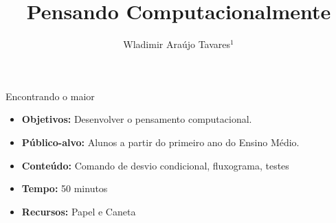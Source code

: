 \documentclass{beamer}
\title {Pensando Computacionalmente}
\author[Wladimir Araújo Tavares]{ Wladimir Araújo Tavares$^{1}$  }
\institute[UFC]{$^{1}$Universidade Federal do Ceará - Campus de Quixadá\\}
\date{}
\begin{document}
\begin{frame}
	\titlepage
\end{frame}




\begin{frame}{Encontrando o maior}

\begin{itemize}
\item \textbf{Objetivos:} Desenvolver o pensamento computacional.

\item \textbf{Público-alvo:}  Alunos a partir do primeiro ano do Ensino Médio.

\item \textbf{Conteúdo:} Comando de desvio condicional, fluxograma, testes

\item \textbf{Tempo:} 50 minutos

\item \textbf{Recursos:} Papel e Caneta

\end{itemize}
    
\end{frame}


\end{document}
